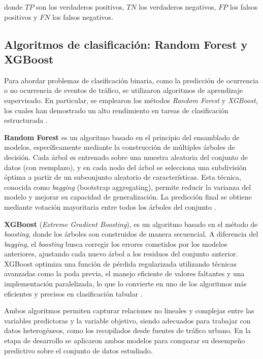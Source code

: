 \documentclass[12pt]{article}
\begin{document}
donde \( TP \) son los verdaderos positivos, \( TN \) los verdaderos negativos, \( FP \) los falsos positivos y \( FN \) los falsos negativos.

\subsection{Algoritmos de clasificación: Random Forest y XGBoost}

Para abordar problemas de clasificación binaria, como la predicción de ocurrencia o no ocurrencia de eventos de tráfico, se utilizaron algoritmos de aprendizaje supervisado. En particular, se emplearon los métodos \textit{Random Forest} y \textit{XGBoost}, los cuales han demostrado un alto rendimiento en tareas de clasificación estructurada \citep{friedman2001elements, chen2016xgboost}.

\textbf{Random Forest} es un algoritmo basado en el principio del ensamblado de modelos, específicamente mediante la construcción de múltiples árboles de decisión. Cada árbol es entrenado sobre una muestra aleatoria del conjunto de datos (con reemplazo), y en cada nodo del árbol se selecciona una subdivisión óptima a partir de un subconjunto aleatorio de características. Esta técnica, conocida como \textit{bagging} (bootstrap aggregating), permite reducir la varianza del modelo y mejorar su capacidad de generalización. La predicción final se obtiene mediante votación mayoritaria entre todos los árboles del conjunto \citep{breiman2001random}.

\textbf{XGBoost} (\textit{Extreme Gradient Boosting}), es un algoritmo basado en el método de \textit{boosting}, donde los árboles son construidos de manera secuencial. A diferencia del \textit{bagging}, el \textit{boosting} busca corregir los errores cometidos por los modelos anteriores, ajustando cada nuevo árbol a los residuos del conjunto anterior. XGBoost optimiza una función de pérdida regularizada utilizando técnicas avanzadas como la poda previa, el manejo eficiente de valores faltantes y una implementación paralelizada, lo que lo convierte en uno de los algoritmos más eficientes y precisos en clasificación tabular \citep{chen2016xgboost}.

Ambos algoritmos permiten capturar relaciones no lineales y complejas entre las variables predictoras y la variable objetivo, siendo adecuados para trabajar con datos heterogéneos, como los recopilados desde fuentes de tráfico urbano. En la etapa de desarrollo se aplicaron ambos modelos para comparar su desempeño predictivo sobre el conjunto de datos estudiado.
\end{document}
